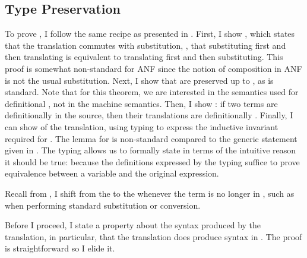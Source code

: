 \subsection{Type Preservation}
To prove , I follow the same recipe as presented in
.
First, I show , which states that the translation
commutes with substitution, \ie, that substituting first and then translating is
equivalent to translating first and then substituting.
This proof is somewhat non-standard for ANF since the notion of composition in
ANF is not the usual substitution.
Next, I show that   are preserved up to
, as is standard.
Note that for this theorem, we are interested in the  semantics used
for definitional , not in the machine semantics.
Then, I show : if two terms are definitionally
 in the source, then their translations are definitionally
.
Finally, I can show  of the  translation,
using  typing to express the inductive invariant required for
.
The lemma for  is non-standard compared to the generic
statement given in .
The  typing allows us to formally state  in terms of the intuitive reason it should be true: because the
definitions expressed by the  typing suffice to prove
equivalence between a  variable and the original
 expression.

\begin{typographical}
Recall from , I shift from the  to the  whenever the term is no
longer in , such as when performing standard substitution or
conversion.
\end{typographical}

Before I proceed, I state a property about the syntax produced by the 
translation, in particular, that the  translation does produce syntax
in .
The proof is straightforward so I elide it.

\begin{theorem}
  \label{cor:anf:form}
\end{theorem}

